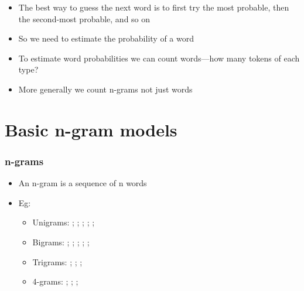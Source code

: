 \begin{frame}
  \begin{itemize}
  \item<1-> The best way to guess the next word is to first try the most
    probable, then the second-most probable, and so on
  \item<1-> So we need to estimate the \alert{probability of a word}
  \item<2-> To estimate word probabilities we can count words---how many
    tokens of each type?
  \item<2-> More generally we count \alert{n-grams} not just words
  \end{itemize}
\end{frame}

\section{Basic n-gram models}

\begin{frame}
  \frametitle{n-grams}
  \begin{itemize}
  \item<1-> An n-gram is a sequence of n words
  \item<2-> Eg: 
    \begin{itemize}
    \item<3-> Unigrams:  ;  ;  ;  ;  ; 
    \item<4-> Bigrams:  ;  ;  ;  ;  ; 
    \item<5-> Trigrams:  ;  ;  ; 
    \item<6-> 4-grams:  ;  ;  ; 
    \end{itemize}
  \end{itemize}
\end{frame}

